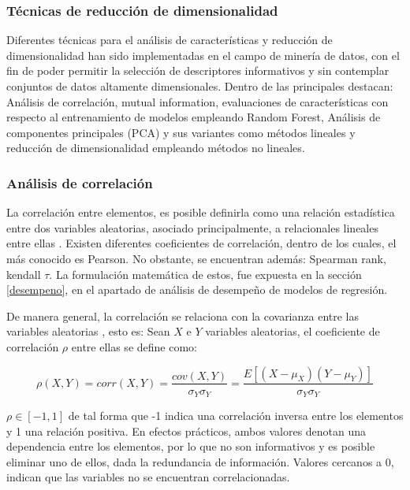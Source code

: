 \subsubsection{Técnicas de reducción de dimensionalidad}

Diferentes técnicas para el análisis de características y reducción de dimensionalidad han sido implementadas en el campo de minería de datos, con el fin de poder permitir la selección de descriptores informativos y sin contemplar conjuntos de datos altamente dimensionales. Dentro de las principales destacan: Análisis de correlación, mutual information, evaluaciones de características con respecto al entrenamiento de modelos empleando Random Forest, Análisis de componentes principales (PCA) y sus variantes como métodos lineales y reducción de dimensionalidad empleando métodos no lineales. 

\subsubsection{Análisis de correlación}

La correlación entre elementos, es posible definirla como una relación estadística entre dos variables aleatorias, asociado principalmente, a relacionales lineales entre ellas \cite{cohen2014applied}. Existen diferentes coeficientes de correlación, dentro de los cuales, el más conocido es Pearson. No obstante, se encuentran además: Spearman rank, kendall $\tau$. La formulación matemática de estos, fue expuesta en la sección \ref{desempeno}, en el apartado de análisis de desempeño de modelos de regresión.

De manera general, la correlación se relaciona con la covarianza entre las variables aleatorias \cite{cohen2014applied}, esto es: Sean $X$ e $Y$ variables aleatorias, el coeficiente de correlación $\rho$ entre ellas se define como:

\begin{equation}
	\rho (X,Y) = corr(X,Y) = \dfrac{cov(X,Y)}{\sigma_{Y}\sigma_{Y}} = \dfrac{E[(X - \mu_{X})(Y - \mu_{Y})]}{\sigma_{Y}\sigma_{Y}}
\end{equation}

$\rho \in [-1, 1]$ de tal forma que -1 indica una correlación inversa entre los elementos y 1 una relación positiva. En efectos prácticos, ambos valores denotan una dependencia entre los elementos, por lo que no son informativos y es posible eliminar uno de ellos, dada la redundancia de información. Valores cercanos a 0, indican que las variables no se encuentran correlacionadas.

